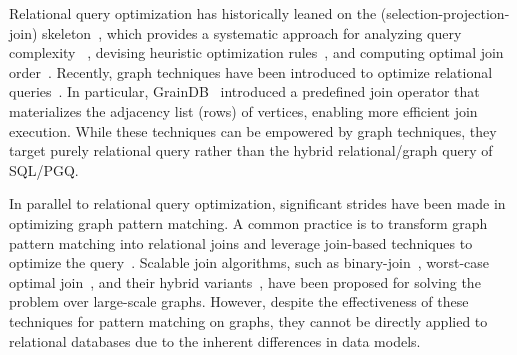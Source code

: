Relational query optimization has historically leaned on the \spj (selection-projection-join) skeleton~\cite{spj,Chaudhuri98}, which provides a systematic approach for analyzing query complexity~\cite{IbarakiK84,ChatterjiEGY02} , devising heuristic optimization rules~\cite{Chaudhuri99heuristics,goldsteinheuristics}, and
computing optimal join order~\cite{Haffnerjoinorder,chenjoinorder}. Recently, graph techniques have been introduced to optimize relational queries~\cite{wanderjoin,Haffnerjoinorder,gqfast,graindb}. %
In particular, GrainDB~\cite{graindb} introduced a predefined join operator that materializes the adjacency list (rows) of vertices, enabling more efficient join execution. While these techniques can be empowered by graph techniques, they target purely relational query rather than the hybrid relational/graph query of SQL/PGQ.

In parallel to relational query optimization, significant strides have been made in optimizing graph pattern matching. A common practice is to transform graph pattern matching into relational joins and leverage join-based techniques to optimize the query~\cite{lai2019distributed,lai2015scalable,ammar2018distributed,huge}. Scalable join algorithms, such as binary-join~\cite{lai2015scalable}, worst-case optimal join~\cite{ammar2018distributed}, and their hybrid variants~\cite{mhedhbi2019optimizing,huge,GLogS}, have been proposed for solving the problem over large-scale graphs. However, despite the effectiveness of these techniques for pattern matching on graphs, they cannot be directly applied to relational databases due to the inherent differences in data models.

